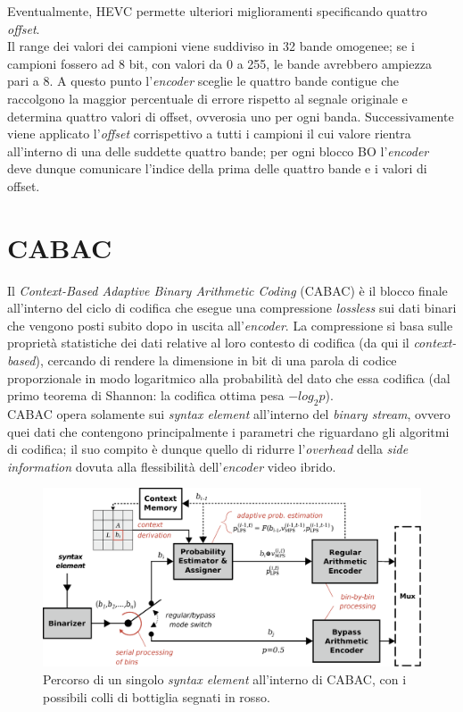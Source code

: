Eventualmente, HEVC permette ulteriori miglioramenti specificando quattro 
\emph{offset}. \\
Il range dei valori dei campioni viene suddiviso in 32 bande omogenee; se i 
campioni fossero ad 8 bit, con valori da 0 a 255, le bande avrebbero ampiezza 
pari a 8. A questo punto l'\textit{encoder} sceglie le quattro bande contigue 
che raccolgono la maggior percentuale di errore rispetto al segnale originale e 
determina quattro valori di offset, ovverosia uno per ogni banda. 
Successivamente viene applicato l'\emph{offset} corrispettivo a tutti i campioni
il cui valore rientra all'interno di una delle suddette quattro bande; per ogni 
blocco BO l'\textit{encoder} deve dunque comunicare l'indice della prima delle 
quattro bande e i valori di offset.


\section{CABAC}
Il \emph{Context-Based Adaptive Binary Arithmetic Coding} (CABAC) è il blocco 
finale all'interno del ciclo di codifica che esegue una compressione 
\emph{lossless} sui dati binari che vengono posti subito dopo in uscita 
all'\textit{encoder}. La compressione si basa sulle proprietà statistiche dei 
dati relative al loro contesto di codifica (da qui il \emph{context-based}), 
cercando di rendere la dimensione in bit di una parola di codice proporzionale 
in modo logaritmico alla probabilità del dato che essa codifica (dal primo 
teorema di Shannon: la codifica ottima pesa $-log_2p$). \\
CABAC opera solamente sui \emph{syntax element} all'interno del \emph{binary 
stream}, ovvero quei dati che contengono principalmente i parametri che 
riguardano gli algoritmi di codifica; il suo compito è dunque quello di ridurre
l'\emph{overhead} della \emph{side information} dovuta alla flessibilità 
dell'\textit{encoder} video ibrido. \\

\begin{figure}[H]
  \centering
  \captionsetup{justification=raggedright}
  \includegraphics[scale=0.35]{Figures/Cabac_overview}
  \caption[Percorso di un \emph{syntax element} dentro CABAC]
	  {Percorso di un singolo \emph{syntax element} all'interno di CABAC,
	   con i possibili colli di bottiglia segnati in rosso.}
\end{figure}


